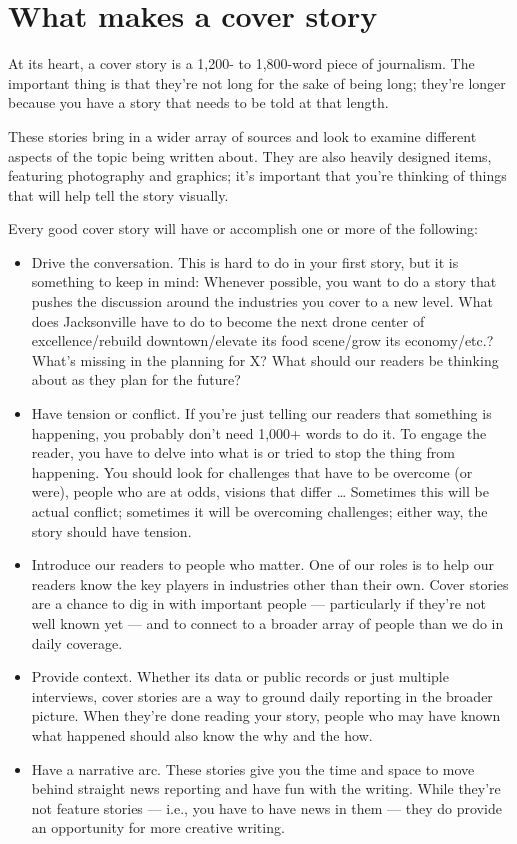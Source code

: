 \documentclass[
  12pt,
  american,
  letterpaperpaper,
  extrafontsizes,onecolumn,openright
  ]{memoir}
\providecommand{\tightlist}{%
  \setlength{\itemsep}{0pt}\setlength{\parskip}{0pt}}
\begin{document}
\hypertarget{what-makes-a-cover-story}{%
\section*{What makes a cover story}\label{what-makes-a-cover-story}}

At its heart, a cover story is a 1,200- to 1,800-word piece of journalism. The important thing is that they're not long for the sake of being long; they're longer because you have a story that needs to be told at that length.

These stories bring in a wider array of sources and look to examine different aspects of the topic being written about. They are also heavily designed items, featuring photography and graphics; it's important that you're thinking of things that will help tell the story visually.

Every good cover story will have or accomplish one or more of the following:

\begin{itemize}
\tightlist
\item
  Drive the conversation. This is hard to do in your first story, but it is something to keep in mind: Whenever possible, you want to do a story that pushes the discussion around the industries you cover to a new level. What does Jacksonville have to do to become the next drone center of excellence/rebuild downtown/elevate its food scene/grow its economy/etc.? What's missing in the planning for X? What should our readers be thinking about as they plan for the future?
\item
  Have tension or conflict. If you're just telling our readers that something is happening, you probably don't need 1,000+ words to do it. To engage the reader, you have to delve into what is or tried to stop the thing from happening. You should look for challenges that have to be overcome (or were), people who are at odds, visions that differ \ldots{} Sometimes this will be actual conflict; sometimes it will be overcoming challenges; either way, the story should have tension.
\item
  Introduce our readers to people who matter. One of our roles is to help our readers know the key players in industries other than their own. Cover stories are a chance to dig in with important people --- particularly if they're not well known yet --- and to connect to a broader array of people than we do in daily coverage.
\item
  Provide context. Whether its data or public records or just multiple interviews, cover stories are a way to ground daily reporting in the broader picture. When they're done reading your story, people who may have known what happened should also know the why and the how.
\item
  Have a narrative arc. These stories give you the time and space to move behind straight news reporting and have fun with the writing. While they're not feature stories --- i.e., you have to have news in them --- they do provide an opportunity for more creative writing.
\end{itemize}
\end{document}
